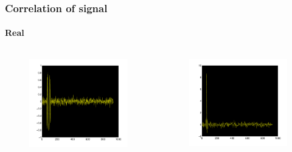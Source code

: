 \documentclass[11pt]{beamer} %
\begin{document}
\begin{frame}
 \frametitle{Correlation of signal}
\framesubtitle{Real}
 \begin{columns}[T]
        \begin{column}{.5\textwidth}
           
        \begin{figure}
\includegraphics[width=1\textwidth]{Figures/SampledRx2DReal.pdf}
\end{figure}
        \end{column}
         \begin{column}{.5\textwidth}

     \begin{figure}
\includegraphics[width=1\textwidth]{Figures/SampledCorrelatedRx2DReal.pdf}
\end{figure}
        \end{column}
\end{columns}
\end{frame}
\end{document}
